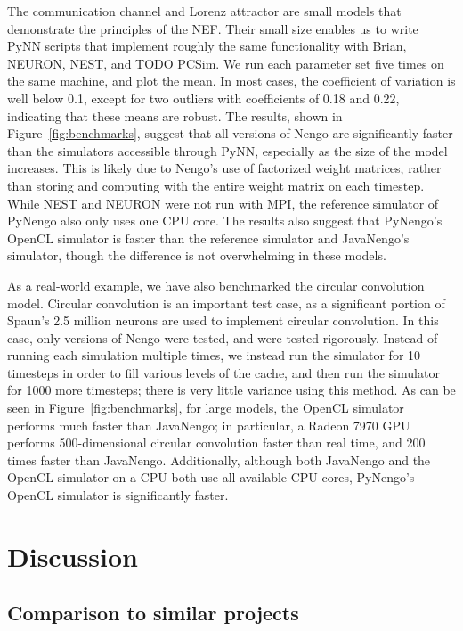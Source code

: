 \documentclass{frontiersSCNS}
\begin{document}
The communication channel and Lorenz attractor
are small models that demonstrate
the principles of the NEF.
Their small size enables us to write
PyNN scripts that implement roughly
the same functionality
with Brian, NEURON, NEST, and TODO PCSim.
We run each parameter set five times
on the same machine,
and plot the mean.
In most cases, the coefficient of variation
is well below 0.1, except for two
outliers with coefficients of 0.18 and 0.22,
indicating that these means are robust.
The results, shown in Figure~\ref{fig:benchmarks},
suggest that all versions of Nengo are significantly
faster than the simulators accessible
through PyNN, especially
as the size of the model increases.
This is likely due to Nengo's
use of factorized weight matrices,
rather than storing and computing with
the entire weight matrix
on each timestep.
While NEST and NEURON were not
run with MPI,
the reference simulator of PyNengo
also only uses one CPU core.
The results also suggest that PyNengo's
OpenCL simulator is faster
than the reference simulator
and JavaNengo's simulator,
though the difference
is not overwhelming in these models.

As a real-world example,
we have also benchmarked
the circular convolution model.
Circular convolution is an important test case,
as a significant portion of Spaun's
2.5 million neurons are used to
implement circular convolution.
In this case, only versions of Nengo
were tested, and were tested rigorously.
Instead of running each simulation multiple times,
we instead run the simulator for 10 timesteps
in order to fill various levels of the cache,
and then run the simulator for 1000 more timesteps;
there is very little variance using this method.
As can be seen in Figure~\ref{fig:benchmarks},
for large models, the OpenCL simulator
performs much faster than JavaNengo;
in particular, a Radeon 7970 GPU performs 500-dimensional
circular convolution faster than real time,
and 200 times faster than JavaNengo.
Additionally, although both JavaNengo
and the OpenCL simulator on a CPU
both use all available CPU cores,
PyNengo's OpenCL simulator is significantly faster.

\section{Discussion}

\subsection{Comparison to similar projects}
\end{document}
